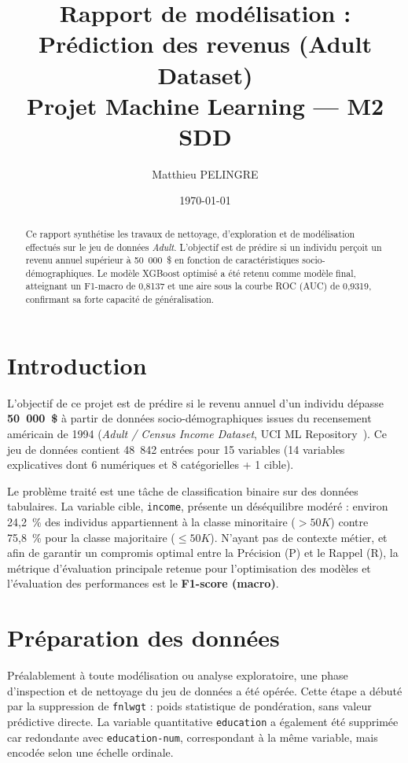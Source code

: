 \documentclass[10pt, a4paper]{article}
\title{\textbf{Rapport de modélisation : Prédiction des revenus (Adult Dataset)} \\
\vspace{0.2cm}
       \normalsize Projet Machine Learning --- M2 SDD}
\author{Matthieu PELINGRE}
\date{\today}
\newcommand{\bornesup}{$>50K$}
\newcommand{\borneinf}{$\leq50K$}
\begin{document}
\maketitle

\begin{abstract}
Ce rapport synthétise les travaux de nettoyage, d'exploration et de modélisation effectués sur le jeu de données \textit{Adult}. L'objectif est de prédire si un individu perçoit un revenu annuel supérieur à 50~000~\$ en fonction de caractéristiques socio-démographiques. Le modèle XGBoost optimisé a été retenu comme modèle final, atteignant un F1-macro de 0,8137 et une aire sous la courbe ROC (AUC) de 0,9319, confirmant sa forte capacité de généralisation.
\end{abstract}


\section{Introduction}
L'objectif de ce projet est de prédire si le revenu annuel d'un individu dépasse \textbf{50~000~\$} à partir de données socio-démographiques issues du recensement américain de 1994 (\emph{Adult / Census Income Dataset}, UCI ML Repository~\cite{adult2}). Ce jeu de données contient 48~842 entrées pour 15 variables (14 variables explicatives dont 6 numériques et 8 catégorielles + 1 cible).

Le problème traité est une tâche de classification binaire sur des données tabulaires. La variable cible, \texttt{income}, présente un déséquilibre modéré : environ 24,2~\% des individus appartiennent à la classe minoritaire (\bornesup) contre 75,8~\% pour la classe majoritaire (\borneinf). N'ayant pas de contexte métier, et afin de garantir un compromis optimal entre la Précision (P) et le Rappel (R), la métrique d'évaluation principale retenue pour l'optimisation des modèles et l'évaluation des performances est le \textbf{F1-score (macro)}.


\section{Préparation des données}

Préalablement à toute modélisation ou analyse exploratoire, une phase d'inspection et de nettoyage du jeu de données a été opérée. Cette étape a débuté par la suppression de \texttt{fnlwgt} : poids statistique de pondération, sans valeur prédictive directe.
La variable quantitative \texttt{education} a également été supprimée car redondante avec \texttt{education-num}, correspondant à la même variable, mais encodée selon une échelle ordinale.
\end{document}
